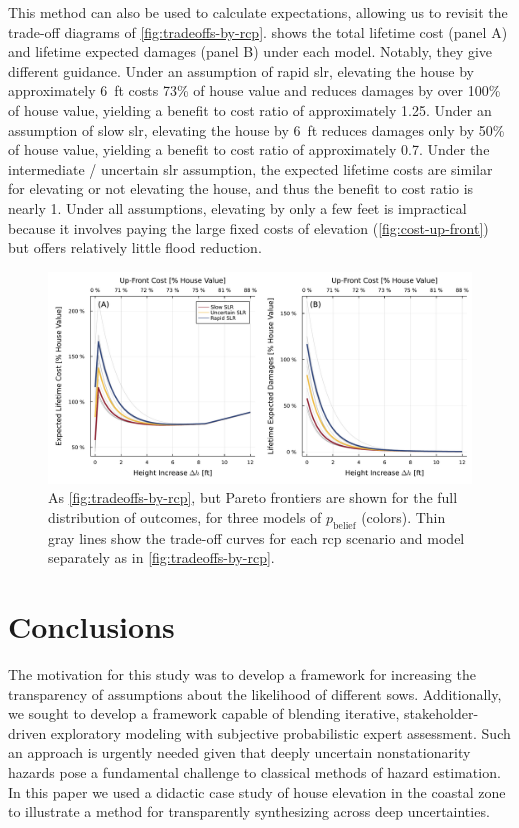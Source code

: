 \documentclass[11pt]{article}
\begin{document}
This method can also be used to calculate expectations, allowing us to revisit the trade-off diagrams of \cref{fig:tradeoffs-by-rcp}.
 shows the total lifetime cost (panel A) and lifetime expected damages (panel B) under each model.
Notably, they give different guidance.
Under an assumption of rapid \gls{slr}, elevating the house by approximately \SI{6}{ft} costs 73\% of house value and reduces damages by over 100\% of house value, yielding a benefit to cost ratio of approximately 1.25.
Under an assumption of slow \gls{slr}, elevating the house by \SI{6}{ft} reduces damages only by 50\% of house value, yielding a benefit to cost ratio of approximately 0.7.
Under the intermediate / uncertain \gls{slr} assumption, the expected lifetime costs are similar for elevating or not elevating the house, and thus the benefit to cost ratio is nearly 1.
Under all assumptions, elevating by only a few feet is impractical because it involves paying the large fixed costs of elevation (\cref{fig:cost-up-front}) but offers relatively little flood reduction.

\begin{figure}
    \centering
    \includegraphics[width=\textwidth]{tradeoffs-by-prior}
    \caption{
        As \cref{fig:tradeoffs-by-rcp}, but Pareto frontiers are shown for the full distribution of outcomes, for three models of $p_\mathrm{belief}$ (colors).
        Thin gray lines show the trade-off curves for each \gls{rcp} scenario and model separately as in \cref{fig:tradeoffs-by-rcp}.
    }\label{fig:tradeoffs-by-prior}
\end{figure}

\section{Conclusions}\label{sec:conclusions}

The motivation for this study was to develop a framework for increasing the transparency of assumptions about the likelihood of different \glspl{sow}.
Additionally, we sought to develop a framework capable of blending iterative, stakeholder-driven exploratory modeling with subjective probabilistic expert assessment.
Such an approach is urgently needed given that deeply uncertain nonstationarity hazards pose a fundamental challenge to classical methods of hazard estimation.
In this paper we used a didactic case study of house elevation in the coastal zone to illustrate a method for transparently synthesizing across deep uncertainties.
\end{document}
